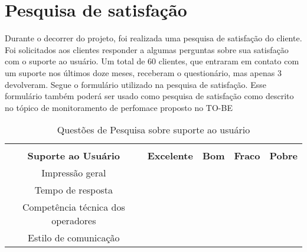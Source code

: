 \section{Pesquisa de satisfação}

Durante o decorrer do projeto, foi
realizada uma pesquisa de satisfação do
cliente. Foi solicitados aos clientes
responder a algumas perguntas sobre sua
satisfação com o suporte ao usuário. Um total de
60 clientes, que entraram em contato com um suporte
nos últimos doze meses, receberam o questionário, mas
apenas 3 devolveram. Segue o formulário utilizado na
pesquisa de satisfação. Esse formulário também
poderá ser usado como pesquisa de satisfação como descrito no
tópico de monitoramento de perfomace proposto no TO-BE


\begin{table}[htb]
\centering
\caption{Questões de Pesquisa sobre suporte ao usuário}
\label{my-label}
\begin{tabular}{cl|c|c|c|c|}
\cline{3-6}
\multicolumn{1}{l}{}                              &                              & \cellcolor[HTML]{9AFF99}                                     & \cellcolor[HTML]{9AFF99}                               & \cellcolor[HTML]{9AFF99}                                 & \cellcolor[HTML]{9AFF99}                                 \\ \cline{1-2}
\multicolumn{2}{|c|}{\cellcolor[HTML]{FFFC9E}\textbf{Suporte ao Usuário}}        & \multirow{-2}{*}{\cellcolor[HTML]{9AFF99}\textbf{Excelente}} & \multirow{-2}{*}{\cellcolor[HTML]{9AFF99}\textbf{Bom}} & \multirow{-2}{*}{\cellcolor[HTML]{9AFF99}\textbf{Fraco}} & \multirow{-2}{*}{\cellcolor[HTML]{9AFF99}\textbf{Pobre}} \\ \hline
\multicolumn{2}{|c|}{\cellcolor[HTML]{FFFFC7}Impressão geral}                    &                                                              &                                                        &                                                          &                                                          \\ \hline
\multicolumn{2}{|c|}{\cellcolor[HTML]{FFFFC7}Tempo de resposta}                  &                                                              &                                                        &                                                          &                                                          \\ \hline
\multicolumn{2}{|c|}{\cellcolor[HTML]{FFFFC7}Competência técnica dos operadores} &                                                              &                                                        &                                                          &                                                          \\ \hline
\multicolumn{2}{|c|}{\cellcolor[HTML]{FFFFC7}Estilo de comunicação}              &                                                              &                                                        &                                                          &                                                          \\ \hline
\end{tabular}
\end{table}


